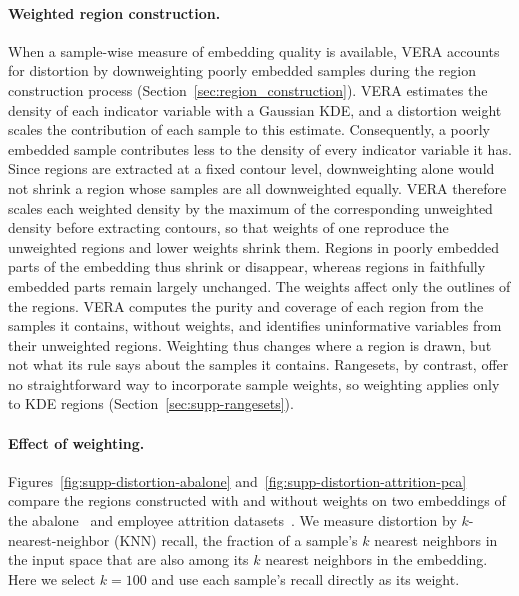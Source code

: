 \documentclass[10pt]{article}
\begin{document}
\paragraph{Weighted region construction.}
When a sample-wise measure of embedding quality is available, VERA accounts for distortion by downweighting poorly embedded samples during the region construction process (Section~\ref{sec:region_construction}).
VERA estimates the density of each indicator variable with a Gaussian KDE, and a distortion weight scales the contribution of each sample to this estimate. Consequently, a poorly embedded sample contributes less to the density of every indicator variable it has.
Since regions are extracted at a fixed contour level, downweighting alone would not shrink a region whose samples are all downweighted equally. VERA therefore scales each weighted density by the maximum of the corresponding unweighted density before extracting contours, so that weights of one reproduce the unweighted regions and lower weights shrink them.
Regions in poorly embedded parts of the embedding thus shrink or disappear, whereas regions in faithfully embedded parts remain largely unchanged.
The weights affect only the outlines of the regions.
VERA computes the purity and coverage of each region from the samples it contains, without weights, and identifies uninformative variables from their unweighted regions.
Weighting thus changes where a region is drawn, but not what its rule says about the samples it contains.
Rangesets, by contrast, offer no straightforward way to incorporate sample weights, so weighting applies only to KDE regions (Section~\ref{sec:supp-rangesets}).

\paragraph{Effect of weighting.}
Figures~\ref{fig:supp-distortion-abalone} and~\ref{fig:supp-distortion-attrition-pca} compare the regions constructed with and without weights on two embeddings of the abalone~\cite{Nash1994} and employee attrition datasets~\cite{IbmEmployeeAttrition}.
We measure distortion by $k$-nearest-neighbor (KNN) recall, the fraction of a sample's $k$ nearest neighbors in the input space that are also among its $k$ nearest neighbors in the embedding. Here we select $k = 100$ and use each sample's recall directly as its weight.
\end{document}
